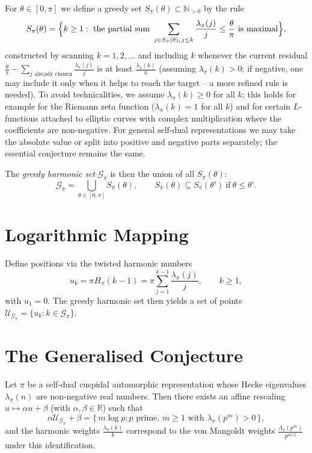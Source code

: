 \documentclass[12pt,a4paper]{article}
\newcommand{\R}{\mathbb{R}}
\newcommand{\N}{\mathbb{N}}
\begin{document}
For \(\theta\in[0,\pi]\) we define a greedy set \(S_\pi(\theta)\subset\N_{>0}\) by the rule
\[
S_\pi(\theta)=\Bigl\{k\ge1:\text{ the partial sum } \sum_{j\in S_\pi(\theta),\,j\le k}\frac{\lambda_\pi(j)}{j}\le \frac{\theta}{\pi}\text{ is maximal}\Bigr\},
\]
constructed by scanning \(k=1,2,\dots\) and including \(k\) whenever the current residual \(\frac{\theta}{\pi}-\sum_{j\text{ already chosen}}\frac{\lambda_\pi(j)}{j}\) is at least \(\frac{\lambda_\pi(k)}{k}\) (assuming \(\lambda_\pi(k)>0\); if negative, one may include it only when it helps to reach the target – a more refined rule is needed).  To avoid technicalities, we assume \(\lambda_\pi(k)\ge0\) for all \(k\); this holds for example for the Riemann zeta function (\(\lambda_\pi(k)=1\) for all \(k\)) and for certain \(L\)-functions attached to elliptic curves with complex multiplication where the coefficients are non‑negative.  For general self‑dual representations we may take the absolute value or split into positive and negative parts separately; the essential conjecture remains the same.

The \emph{greedy harmonic set} \(\mathcal{G}_\pi\) is then the union of all \(S_\pi(\theta)\):
\[
\mathcal{G}_\pi=\bigcup_{\theta\in[0,\pi]} S_\pi(\theta),\qquad S_\pi(\theta)\subseteq S_\pi(\theta')\ \text{if}\ \theta\le\theta'.
\]

\section{Logarithmic Mapping}
Define positions via the twisted harmonic numbers
\[
u_k=\pi H_\pi(k-1)=\pi\sum_{j=1}^{k-1}\frac{\lambda_\pi(j)}{j},\qquad k\ge1,
\]
with \(u_1=0\).  The greedy harmonic set then yields a set of points \(\mathcal{U}_{\mathcal{G}_\pi}=\{u_k:k\in\mathcal{G}_\pi\}\).

\section{The Generalised Conjecture}
\begin{conjecture}\label{conj:GGPC}
Let \(\pi\) be a self‑dual cuspidal automorphic representation whose Hecke eigenvalues \(\lambda_\pi(n)\) are non‑negative real numbers.  Then there exists an affine rescaling \(u\mapsto \alpha u+\beta\) (with \(\alpha,\beta\in\R\)) such that
\[
\alpha\mathcal{U}_{\mathcal{G}_\pi}+\beta=\{\,m\log p:p\text{ prime},\,m\ge1\text{ with }\lambda_\pi(p^m)>0\,\},
\]
and the harmonic weights \(\frac{\lambda_\pi(k)}{k}\) correspond to the von Mangoldt weights \(\frac{\Lambda_\pi(p^m)}{p^{m/2}}\) under this identification.
\end{conjecture}
\end{document}
